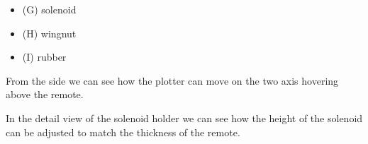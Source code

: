 \begin{minipage}[t]{0.5\textwidth}
    \begin{itemize}
        \item (G) solenoid
        \item (H) wingnut
        \item (I) rubber
    \end{itemize}
    \vspace{5mm}

    From the side we can see how the plotter can move on the two axis hovering above the remote.
\end{minipage}
\begin{minipage}[t]{0.45\textwidth}
    \centering{}
\end{minipage}\hfill


\begin{minipage}[t]{0.30\textwidth}
    \centering{}
\end{minipage}\hfill
\begin{minipage}[t]{0.65\textwidth}
    \vspace{5mm}
    In the detail view of the solenoid holder we can see how the height of the solenoid can be adjusted to match the thickness of the remote.
\end{minipage}


